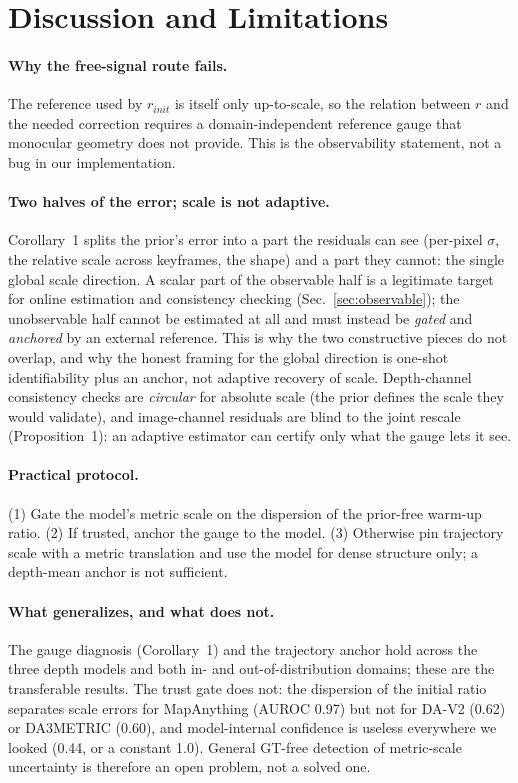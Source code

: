 \section{Discussion and Limitations}
\label{sec:discussion}

\paragraph{Why the free-signal route fails.} The reference used by $r_{init}$ is
itself only up-to-scale, so the relation between $r$ and the needed correction
requires a domain-independent reference gauge that monocular geometry does not
provide. This is the observability statement, not a bug in our implementation.

\paragraph{Two halves of the error; scale is not adaptive.} Corollary~1 splits
the prior's error into a part the residuals can see (per-pixel $\sigma$, the
relative scale across keyframes, the shape) and a part they cannot: the single
global scale direction. A scalar part of the observable half is a legitimate
target for online estimation and consistency checking (Sec.~\ref{sec:observable}); the unobservable
half cannot be estimated at
all and must instead be \emph{gated} and \emph{anchored} by an external reference.
This is why the two constructive pieces do not overlap, and why the honest framing
for the global direction is one-shot identifiability plus an anchor, not
adaptive recovery of scale. Depth-channel consistency checks are \emph{circular}
for absolute scale (the prior defines the scale they would validate), and
image-channel residuals are blind to the joint rescale (Proposition~1): an
adaptive estimator can certify only what the gauge lets it see.

\paragraph{Practical protocol.} (1) Gate the model's metric scale on the
dispersion of the prior-free warm-up ratio. (2) If trusted, anchor the gauge to
the model. (3) Otherwise pin trajectory scale with a metric translation and use
the model for dense structure only; a depth-mean anchor is not sufficient.

\paragraph{What generalizes, and what does not.} The gauge diagnosis
(Corollary~1) and the trajectory anchor hold across the three depth models and
both in- and out-of-distribution domains; these are the transferable results. The
trust gate does not: the dispersion of the initial ratio separates scale errors
for MapAnything (AUROC 0.97) but not for DA-V2 (0.62) or DA3METRIC (0.60), and
model-internal confidence is useless everywhere we looked (0.44, or a constant
1.0). General GT-free detection of metric-scale uncertainty is therefore an open
problem, not a solved one.

